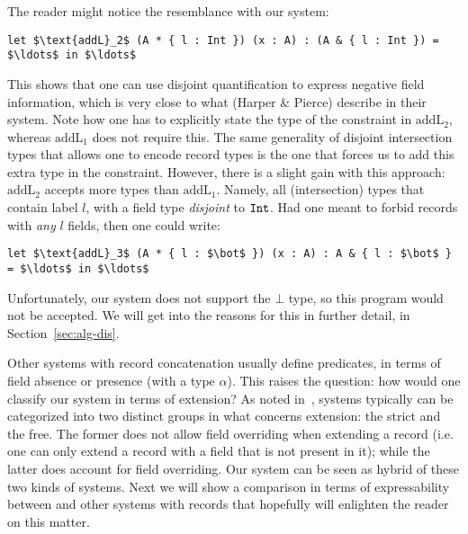 The reader might notice the resemblance with our system:
\begin{lstlisting}[mathescape=true]
let $\text{addL}_2$ (A * { l : Int }) (x : A) : (A & { l : Int }) = $\ldots$ in $\ldots$ 
\end{lstlisting}


This shows that one can use disjoint quantification to express negative field information, which
is very close to what (Harper \& Pierce) describe in their system.  
Note how one has to explicitly state the type of the constraint in $\text{addL}_2$, whereas 
$\text{addL}_1$ does not require this.
The same generality of disjoint intersection types that allows one to encode record types is the
one that forces us to add this extra type in the constraint.
However, there is a slight gain with this approach: $\text{addL}_2$ accepts more types than
$\text{addL}_1$.
Namely, all (intersection) types that contain label $l$, with a field type \emph{disjoint} to
$\texttt{Int}$.
Had one meant to forbid records with \emph{any} $l$ fields, then one could write:

\begin{lstlisting}[mathescape=true]
let $\text{addL}_3$ (A * { l : $\bot$ }) (x : A) : A & { l : $\bot$ } = $\ldots$ in $\ldots$ 
\end{lstlisting}
Unfortunately, our system does not support the $\bot$ type, so this program would not be accepted.
We will get into the reasons for this in further detail, in Section~\ref{sec:alg-dis}.

Other systems with record concatenation usually define predicates, in terms of field absence or 
presence (with a type $\alpha$). 
This raises the question: how would one classify our system in terms of extension? 
As noted in~\cite{leijen2004extensible}, systems typically can be categorized into two distinct groups
in what concerns extension: the strict and the free.
The former does not allow field overriding when extending a record (i.e. one can only extend a 
record with a field that is not present in it); while the latter does account for field overriding.
Our system can be seen as hybrid of these two kinds of systems.
Next we will show a comparison in terms of expressability between \name and other systems 
with records that hopefully will enlighten the reader on this matter.

